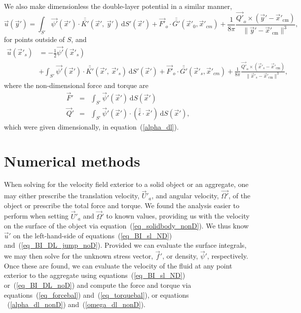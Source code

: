 We also make dimensionless the double-layer potential in a similar manner, 
 \begin{equation}
 \vec{u}(\vec{y}') = \int_{S'}
 \vec{\psi'}(\vec{x}') \cdot  \bar{\bar{K'}}(\vec{x}', \ \vec{y}')  \ \text{d}S' (\vec{x}') + \vec{F'}_o \cdot \bar{\bar{G'}}(\vec{x}'_{0},\vec{x}'_{cm})
 +\frac{1}{8 \pi} \frac{\vec{Q'}_o \times
 (\vec{y}'   - \vec{x}'_{\text{cm}} ) }{\| \vec{y}'   - \vec{x}'_{\text{cm}} \|^3 },
  \label{eq_BI_DL_noD}
 \end{equation}
 for points outside of $S$, and
 \begin{align}
 \vec{u}(\vec{x}'_s) 
 & =  -\frac{1}{2}\vec{\psi'}(\vec{x}'_s)
 \nonumber  \\
&+  \int_{S'}
 \vec{\psi'}(\vec{x}') \cdot  \bar{\bar{K'}}(\vec{x}', \ \vec{x}'_s)  \ \text{d}S' (\vec{x}') + \vec{F'}_o \cdot \bar{\bar{G'}}(\vec{x}'_{s},\vec{x}'_{cm})
 +\frac{1}{8 \pi} \frac{\vec{Q'}_o \times
 (\vec{x}'_s   - \vec{x}'_{\text{cm}} ) }{\| \vec{x}'_s   - \vec{x}'_{\text{cm}} \|^3 },
  \label{eq_BI_DL_jump_noD}
 \end{align}
 where the non-dimensional force and torque are
 \begin{eqnarray}
  \vec{F}' &=&  \int_{S'}  \vec{\psi}'( \vec{x}') \ \text{d}S(\vec{x}')  
 \label{alpha_dl_nonD} \\
  \vec{Q}' &=&  \int_{S'}  \vec{\psi}'(\vec{x}')  \cdot  (\bar{\bar{\bar{\epsilon}}} \cdot \vec{x}' )  \ \text{d}S(\vec{x}') ,
 \label{omega_dl_nonD}
 \end{eqnarray}
 which were given dimensionally, in equation~(\ref{alpha_dl}).
\section{Numerical methods}
\label{sec:numerical}
When solving for the velocity field exterior to a solid object or an aggregate, one may either 
prescribe the translation velocity,  $ \vec{U}'_a$, and angular velocity, $ \vec{\Omega'}$, of the object 
or prescribe 
the total force and torque. 
We found the analysis easier to perform when setting $\vec{U}'_a$ and $\vec{\Omega}'$ to known values, providing us with the velocity on the surface of the object via equation~(\ref{eq_solidbody_nonD}). We thus know 
 $\vec{u}'$ on the left-hand-side of equations~(\ref{eq_BI_sl_ND}) and~(\ref{eq_BI_DL_jump_noD}). Provided we can evaluate the surface integrals, we may then solve for the unknown stress vector, $\vec{f}'$, or density, $\vec{\psi}'$, respectively. Once these are found, we can evaluate the velocity of the fluid at any point exterior to the aggregate using equations~(\ref{eq_BI_sl_ND}) or~(\ref{eq_BI_DL_noD}) and compute the force and torque via equations~(\ref{eq_forcebal}) and~(\ref{eq_torquebal}), or equations ~(\ref{alpha_dl_nonD}) and~(\ref{omega_dl_nonD}).

